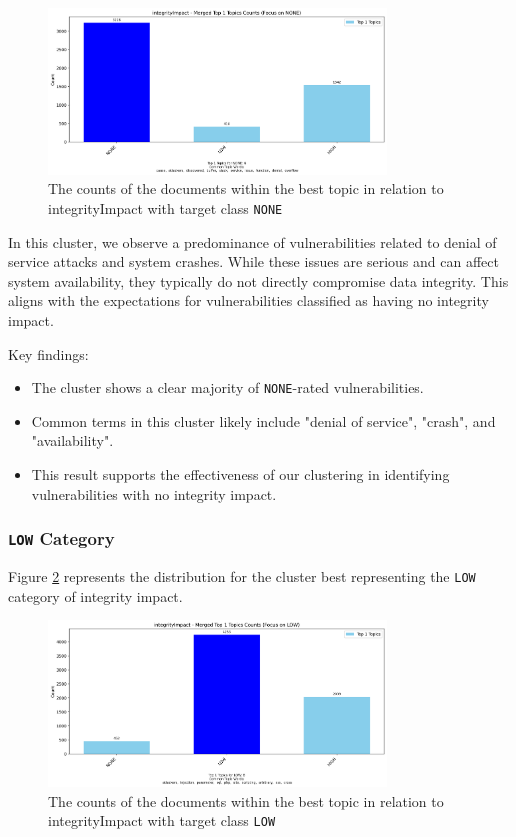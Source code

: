 \begin{figure}[h]
	\centering
	\includegraphics[width=0.8\textwidth]{figures/integrityImpact/merged_top_k_topics_category_focus_counts_integrityImpact_NONE_k1.png}
	\caption{The counts of the documents within the best topic in relation to integrityImpact with target class \texttt{NONE}}
	\label{fig:integrityImpact_20_NONE}
\end{figure}

In this cluster, we observe a predominance of vulnerabilities related to denial of service attacks
and system crashes. While these issues are serious and can affect system availability, they
typically do not directly compromise data integrity. This aligns with the expectations for
vulnerabilities classified as having no integrity impact.

Key findings:
\begin{itemize}
	\item The cluster shows a clear majority of \texttt{NONE}-rated vulnerabilities.
	\item Common terms in this cluster likely include "denial of service", "crash", and "availability".
	\item This result supports the effectiveness of our clustering in identifying vulnerabilities with no integrity impact.
\end{itemize}

\subsubsection{\texttt{LOW} Category}
Figure \ref{fig:integrityImpact_20_LOW} represents the distribution for the cluster best representing the \texttt{LOW} category of integrity impact.

\begin{figure}[h]
	\centering
	\includegraphics[width=0.8\textwidth]{figures/integrityImpact/merged_top_k_topics_category_focus_counts_integrityImpact_LOW_k1.png}
	\caption{The counts of the documents within the best topic in relation to integrityImpact with target class \texttt{LOW}}
	\label{fig:integrityImpact_20_LOW}
\end{figure}

